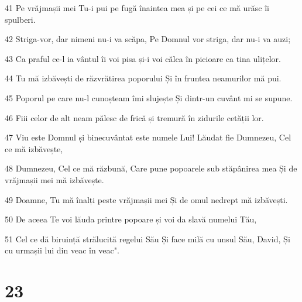 \par 41 Pe vrăjmașii mei Tu-i pui pe fugă înaintea mea și pe cei ce mă urăsc îi spulberi.
\par 42 Striga-vor, dar nimeni nu-i va scăpa, Pe Domnul vor striga, dar nu-i va auzi;
\par 43 Ca praful ce-l ia vântul îi voi pisa și-i voi călca în picioare ca tina ulițelor.
\par 44 Tu mă izbăvești de răzvrătirea poporului Și în fruntea neamurilor mă pui.
\par 45 Poporul pe care nu-l cunoșteam îmi slujește Și dintr-un cuvânt mi se supune.
\par 46 Fiii celor de alt neam pălesc de frică și tremură în zidurile cetății lor.
\par 47 Viu este Domnul și binecuvântat este numele Lui! Lăudat fie Dumnezeu, Cel ce mă izbăvește,
\par 48 Dumnezeu, Cel ce mă răzbună, Care pune popoarele sub stăpânirea mea Și de vrăjmașii mei mă izbăvește.
\par 49 Doamne, Tu mă înalți peste vrăjmașii mei Și de omul nedrept mă izbăvești.
\par 50 De aceea Te voi lăuda printre popoare și voi da slavă numelui Tău,
\par 51 Cel ce dă biruință strălucită regelui Său Și face milă cu unsul Său, David, Și cu urmașii lui din veac în veac".

\chapter{23}

